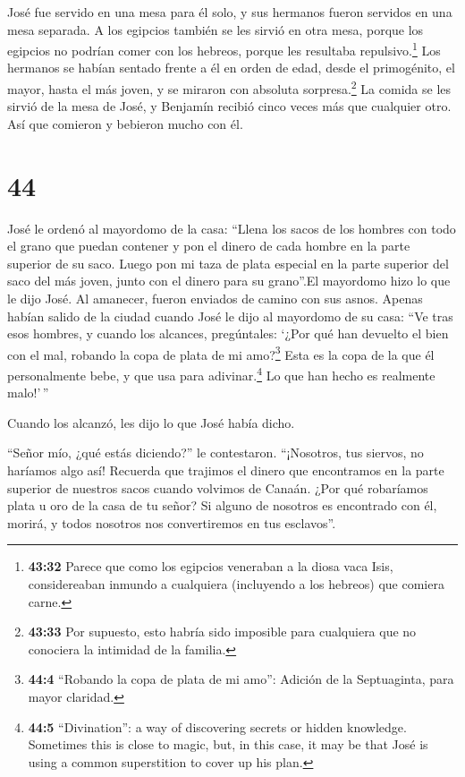  José fue servido en una mesa para él solo, y sus hermanos
fueron servidos en una mesa separada. A los egipcios también se les
sirvió en otra mesa, porque los egipcios no podrían comer con los
hebreos, porque les resultaba repulsivo.\footnote{\textbf{43:32} Parece
  que como los egipcios veneraban a la diosa vaca Isis, considereaban
  inmundo a cualquiera (incluyendo a los hebreos) que comiera carne.}
 Los hermanos se habían sentado frente a él en orden de
edad, desde el primogénito, el mayor, hasta el más joven, y se miraron
con absoluta sorpresa.\footnote{\textbf{43:33} Por supuesto, esto habría
  sido imposible para cualquiera que no conociera la intimidad de la
  familia.}  La comida se les sirvió de la mesa de José, y
Benjamín recibió cinco veces más que cualquier otro. Así que comieron y
bebieron mucho con él.

\hypertarget{section-43}{%
\section{44}\label{section-43}}

 José le ordenó al mayordomo de la casa: ``Llena los sacos
de los hombres con todo el grano que puedan contener y pon el dinero de
cada hombre en la parte superior de su saco.  Luego pon mi
taza de plata especial en la parte superior del saco del más joven,
junto con el dinero para su grano''.El mayordomo hizo lo que le dijo
José.  Al amanecer, fueron enviados de camino con sus asnos.
 Apenas habían salido de la ciudad cuando José le dijo al
mayordomo de su casa: ``Ve tras esos hombres, y cuando los alcances,
pregúntales: `¿Por qué han devuelto el bien con el mal, robando la copa
de plata de mi amo?\footnote{\textbf{44:4} ``Robando la copa de plata de
  mi amo'': Adición de la Septuaginta, para mayor claridad.}
 Esta es la copa de la que él personalmente bebe, y que usa
para adivinar.\footnote{\textbf{44:5} ``Divination'': a way of
  discovering secrets or hidden knowledge. Sometimes this is close to
  magic, but, in this case, it may be that José is using a common
  superstition to cover up his plan.} Lo que han hecho es realmente
malo!'\,''

 Cuando los alcanzó, les dijo lo que José había dicho.

 ``Señor mío, ¿qué estás diciendo?'' le contestaron.
``¡Nosotros, tus siervos, no haríamos algo así!  Recuerda
que trajimos el dinero que encontramos en la parte superior de nuestros
sacos cuando volvimos de Canaán. ¿Por qué robaríamos plata u oro de la
casa de tu señor?  Si alguno de nosotros es encontrado con
él, morirá, y todos nosotros nos convertiremos en tus esclavos''.

